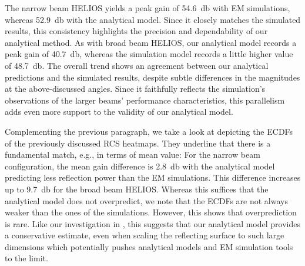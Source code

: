 The narrow beam HELIOS yields a peak gain of \SI{54.6}{\decibel} with EM simulations, whereas \SI{52.9}{\decibel} with the analytical model. Since it closely matches the simulated results, this consistency highlights the precision and dependability of our analytical method. As with broad beam HELIOS, our analytical model records a peak gain of \SI{40.7}{\decibel}, whereas the simulation model records a little higher value of \SI{48.7}{\decibel}. The overall trend shows an agreement between our analytical predictions and the simulated results, despite subtle differences in the magnitudes at the above-discussed angles. Since it faithfully reflects the simulation's observations of the larger beams' performance characteristics, this parallelism adds even more support to the validity of our analytical model.

Complementing the previous paragraph, we take a look at  depicting the ECDFs of the previously discussed RCS heatmaps. They underline that there is a fundamental match, e.g., in terms of mean value: For the narrow beam configuration, the mean gain difference is \SI{2.8}{\decibel} with the analytical model predicting less reflection power than the EM simulations. This difference increases up to \SI{9.7}{\decibel} for the broad beam HELIOS. Whereas this suffices that the analytical model does not overpredict, we note that the ECDFs are not always weaker than the ones of the simulations. However, this shows that overprediction is rare. Like our investigation in , this suggests that our analytical model provides a conservative estimate, even when scaling the reflecting surface to such large dimensions which potentially pushes analytical models and EM simulation tools to the limit.

